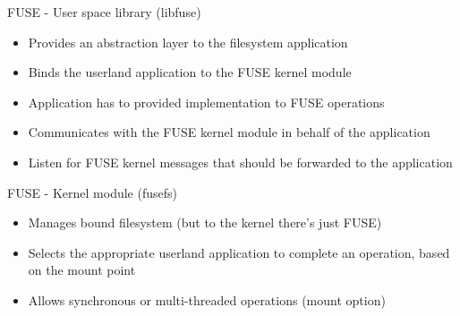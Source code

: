 \documentclass{beamer}
\begin{document}
\begin{frame}{FUSE - User space library (libfuse)}
	
	\begin{itemize}[<+->]

		\item{Provides an abstraction layer to the filesystem application}		
		\item{Binds the userland application to the FUSE kernel module}
		\item{Application has to provided implementation to FUSE operations}		
		\item{Communicates with the FUSE kernel module in behalf of the application}
		\item{Listen for FUSE kernel messages that should be forwarded to the application}
			
	\end{itemize}
	
\end{frame}

\begin{frame}{FUSE - Kernel module (fusefs)}
	
	\begin{itemize}[<+->]

		\item{Manages bound filesystem (but to the kernel there's just FUSE)}
		\item{Selects the appropriate userland application to complete an operation, based on the mount point}
		\item{Allows synchronous or multi-threaded operations (mount option)}

	\end{itemize}
	
\end{frame}
\end{document}
